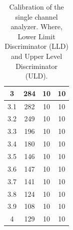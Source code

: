 \documentclass[a4paper]{report}
\numberwithin{equation}{section}
\begin{document}
\begin{table}[!ht]
\begin{tabular}{|c|c|c|c|}
        3 & 284 & 10 & 10 \\ \hline
        3.1 & 282 & 10 & 10 \\ \hline
        3.2 & 249 & 10 & 10 \\ \hline
        3.3 & 196 & 10 & 10 \\ \hline
        3.4 & 180 & 10 & 10 \\ \hline
        3.5 & 146 & 10 & 10 \\ \hline
        3.6 & 147 & 10 & 10 \\ \hline
        3.7 & 141 & 10 & 10 \\ \hline
        3.8 & 124 & 10 & 10 \\ \hline
        3.9 & 108 & 10 & 10 \\ \hline
        4 & 129 & 10 & 10 \\ \hline
    \end{tabular}
    \caption{Calibration of the single channel analyzer. Where, Lower Limit Discriminator (LLD) and Upper Level Discriminator (ULD).}
    \label{calibration}
\end{table}
\end{document}
